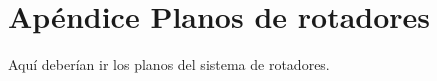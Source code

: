 
\chapter{Apéndice Planos de rotadores} %

\label{AppendixA} %


Aquí deberían ir los planos del sistema de rotadores. 